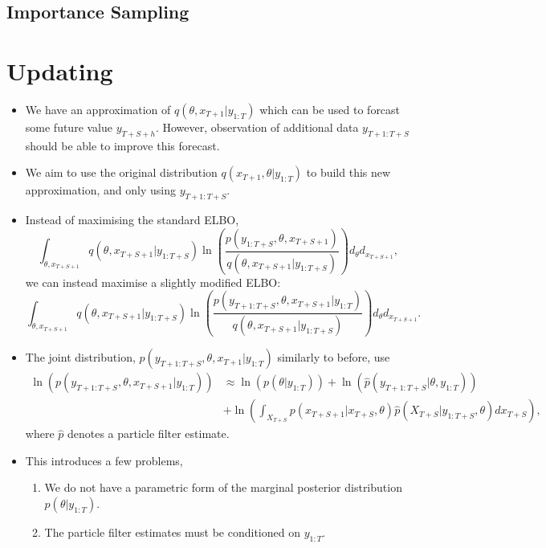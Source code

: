 \documentclass[12pt,a4paper]{article}%
\numberwithin{equation}{section}
\begin{document}
\subsection{Importance Sampling}

\citep{Sakaya2017}


\section{Updating}

\begin{itemize}
\item We have an approximation of $q(\theta, x_{T+1} | y_{1:T})$ which can be used to forcast some future value $y_{T+S+h}$. However, observation of additional data $y_{T+1:T+S}$ should be able to improve this forecast.
\item We aim to use the original distribution $q(x_{T+1}, \theta | y_{1:T})$ to build this new approximation, and only using $y_{T+1:T+S}$.
\item Instead of maximising the standard ELBO,
\begin{equation*}
\int_{\theta, x_{T+S+1}} q(\theta, x_{T+S+1}| y_{1:T+S}) \ln \left(\frac{p(y_{1:T+S}, \theta, x_{T+S+1})}{q(\theta, x_{T+S+1}| y_{1:T+S})} \right) d_{\theta} d_{x_{T+S+1}},
\end{equation*}
we can instead maximise a slightly modified ELBO:
\begin{equation*}
\int_{\theta, x_{T+S+1}} q(\theta, x_{T+S+1}| y_{1:T+S}) \ln \left(\frac{p(y_{T+1:T+S}, \theta, x_{T+S+1} | y_{1:T})}{q(\theta, x_{T+S+1}| y_{1:T+S})} \right) d_{\theta} d_{x_{T+S+1}}.
\end{equation*}
\item The joint distribution, $p(y_{T+1:T+S}, \theta, x_{T+1} | y_{1:T})$ similarly to before, use
\begin{align*}
\ln(p(y_{T+1:T+S}, \theta, x_{T+S+1} | y_{1:T})) &\approx \ln(p(\theta | y_{1:T} )) + \ln(\hat{p}(y_{T+1:T+S} | \theta, y_{1:T}))\\
&+ \ln\left(\int_{X_{T+S}} p(x_{T+S+1} | x_{T+S}, \theta) \hat{p}(X_{T+S} | y_{1:T+S}, \theta) d x_{T+S}\right),
\end{align*}
where $\hat{p}$ denotes a particle filter estimate.
\item This introduces a few problems,
\begin{enumerate}
\item We do not have a parametric form of the marginal posterior distribution $p(\theta | y_{1:T})$.
\item The particle filter estimates must be conditioned on $y_{1:T}$.

\end{enumerate}
\end{itemize}
\end{document}
